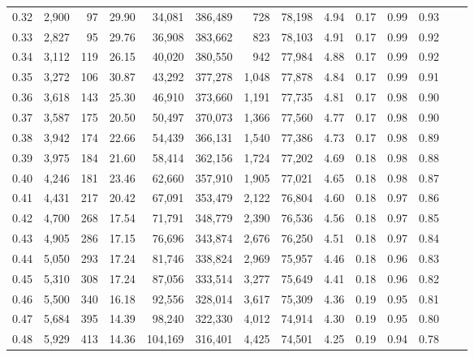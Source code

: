 \begin{tabular}{rrrrrrrrrrrrrr}
0.32 &  2,900 &     97 &   29.90 &   34,081 &  386,489 &     728 &  78,198 &  4.94 &  0.17 &  0.99 &      0.93 \\
0.33 &  2,827 &     95 &   29.76 &   36,908 &  383,662 &     823 &  78,103 &  4.91 &  0.17 &  0.99 &      0.92 \\
0.34 &  3,112 &    119 &   26.15 &   40,020 &  380,550 &     942 &  77,984 &  4.88 &  0.17 &  0.99 &      0.92 \\
0.35 &  3,272 &    106 &   30.87 &   43,292 &  377,278 &   1,048 &  77,878 &  4.84 &  0.17 &  0.99 &      0.91 \\
0.36 &  3,618 &    143 &   25.30 &   46,910 &  373,660 &   1,191 &  77,735 &  4.81 &  0.17 &  0.98 &      0.90 \\
0.37 &  3,587 &    175 &   20.50 &   50,497 &  370,073 &   1,366 &  77,560 &  4.77 &  0.17 &  0.98 &      0.90 \\
0.38 &  3,942 &    174 &   22.66 &   54,439 &  366,131 &   1,540 &  77,386 &  4.73 &  0.17 &  0.98 &      0.89 \\
0.39 &  3,975 &    184 &   21.60 &   58,414 &  362,156 &   1,724 &  77,202 &  4.69 &  0.18 &  0.98 &      0.88 \\
0.40 &  4,246 &    181 &   23.46 &   62,660 &  357,910 &   1,905 &  77,021 &  4.65 &  0.18 &  0.98 &      0.87 \\
0.41 &  4,431 &    217 &   20.42 &   67,091 &  353,479 &   2,122 &  76,804 &  4.60 &  0.18 &  0.97 &      0.86 \\
0.42 &  4,700 &    268 &   17.54 &   71,791 &  348,779 &   2,390 &  76,536 &  4.56 &  0.18 &  0.97 &      0.85 \\
0.43 &  4,905 &    286 &   17.15 &   76,696 &  343,874 &   2,676 &  76,250 &  4.51 &  0.18 &  0.97 &      0.84 \\
0.44 &  5,050 &    293 &   17.24 &   81,746 &  338,824 &   2,969 &  75,957 &  4.46 &  0.18 &  0.96 &      0.83 \\
0.45 &  5,310 &    308 &   17.24 &   87,056 &  333,514 &   3,277 &  75,649 &  4.41 &  0.18 &  0.96 &      0.82 \\
0.46 &  5,500 &    340 &   16.18 &   92,556 &  328,014 &   3,617 &  75,309 &  4.36 &  0.19 &  0.95 &      0.81 \\
0.47 &  5,684 &    395 &   14.39 &   98,240 &  322,330 &   4,012 &  74,914 &  4.30 &  0.19 &  0.95 &      0.80 \\
0.48 &  5,929 &    413 &   14.36 &  104,169 &  316,401 &   4,425 &  74,501 &  4.25 &  0.19 &  0.94 &      0.78 \\

\end{tabular}
